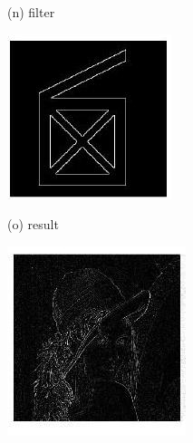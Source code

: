 \documentclass[10pt]{article}
\begin{document}
(n) filter

\includegraphics[max width=\textwidth]{2022_01_06_b5ce182ed1bd5f482e5bg-16(3)}

(o) result

\includegraphics[max width=\textwidth]{2022_01_06_b5ce182ed1bd5f482e5bg-16(4)}
\end{document}
